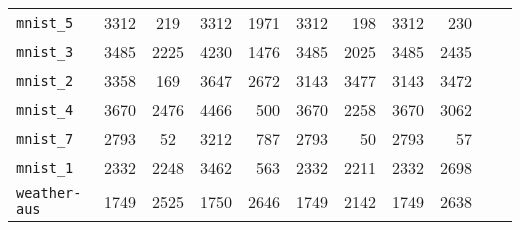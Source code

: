 \begin{tabular}{lccrrrrrrrr}
\texttt{mnist\_5} & 3312 & 219 & 3312 & 1971 & 3312 & 198 & 3312 & 230\\
\texttt{mnist\_3} & 3485 & 2225 & 4230 & 1476 & 3485 & 2025 & 3485 & 2435\\
\texttt{mnist\_2} & 3358 & 169 & 3647 & 2672 & 3143 & 3477 & 3143 & 3472\\
\texttt{mnist\_4} & 3670 & 2476 & 4466 & 500 & 3670 & 2258 & 3670 & 3062\\
\texttt{mnist\_7} & 2793 & 52 & 3212 & 787 & 2793 & 50 & 2793 & 57\\
\texttt{mnist\_1} & 2332 & 2248 & 3462 & 563 & 2332 & 2211 & 2332 & 2698\\
\texttt{weather-aus} & 1749 & 2525 & 1750 & 2646 & 1749 & 2142 & 1749 & 2638\\
\bottomrule
\end{tabular}
